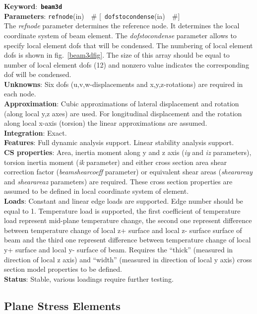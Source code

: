 \documentclass[a4paper]{article}
\newcommand{\descitem}[1]{{\noindent \bf #1}:}
\newcommand{\elemkeyword}[1]{\descitem{Keyword}~{\bf \texttt{#1}}}
\newcommand{\elemparam}[2]{{{\texttt{#1}\tiny (#2)}~~\#}}
\newcommand{\optelemparam}[2]{{[~\elemparam{#1}{#2}]}}
\newcommand{\param}[1]{{\em #1}}
\begin{document}
\elemkeyword{beam3d}\\
\descitem{Parameters} \elemparam{refnode}{in}
\optelemparam{dofstocondense}{ia}\\
The \param{refnode} parameter
determines the reference node. It determines the local coordinate
system of beam element. The \param{dofstocondense} parameter allows to
specify local element dofs that will be condensed. The numbering of
local element dofs is shown in fig.~\ref{beam3dfig}. The size of this
array should be equal to number of local element dofs (12) and nonzero
value indicates the corresponding dof will be condensed.\\
\descitem{Unknowns}
Six dofs (u,v,w-displacements and x,y,z-rotations) are required in each node.\\
\descitem{Approximation} Cubic  approximations of lateral displacement and
rotation (along local y,z axes) are used. For longitudinal displacement
and the rotation along local x-axis (torsion) the linear
approximations are assumed.\\
\descitem{Integration} Exact.\\
\descitem{Features} Full dynamic analysis support. Linear stability
analysis support.\\
\descitem{CS properties} Area, inertia moment along y and z axis (\param{iy} and \param{iz} parameters), torsion inertia moment (\param{ik} parameter) and either cross section area shear correction factor (\param{beamshearcoeff} parameter) or equivalent shear areas (\param{shearareay} and \param{shearareaz} parameters) are required. These
cross section properties are assumed to be defined in local coordinate
system of element.\\
\descitem{Loads}  Constant and linear edge loads are supported.
Edge number should be equal to 1. Temperature load is
supported, the first coefficient of temperature load represent
mid-plane temperature change, the second one represent difference
between temperature change of local z+ surface and local
z- surface surface of beam and the third one represent difference
between temperature change of local y+ surface and  local
y- surface of beam. Requires the ``thick'' (measured in direction of
local z axis) and ``width'' (measured in direction of local y axis) cross section
model properties to be defined.\\
\descitem{Status} Stable, various loadings require further testing.

\subsection{Plane Stress Elements}
\end{document}
